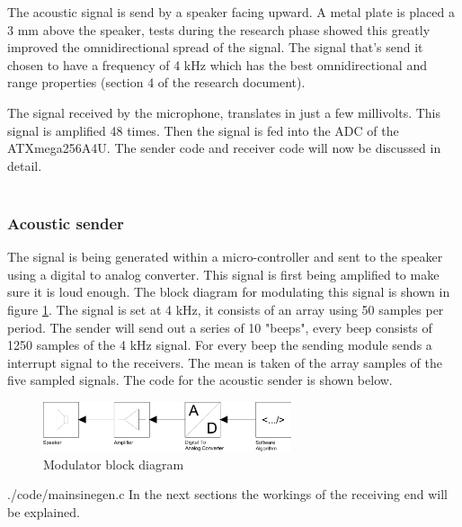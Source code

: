 \documentclass[10pt,a4paper]{article}
\begin{document}
The acoustic signal is send by a speaker facing upward. A metal plate is placed a 3 mm above the speaker, tests during the research phase showed this greatly improved the omnidirectional spread of the signal. The signal that's send it chosen to have a frequency of 4 kHz which has the best omnidirectional and range properties (section 4 of the research document).


The signal received by the microphone, translates in just a few millivolts. This signal is amplified 48 times. Then the signal is fed into the ADC of the ATXmega256A4U. The sender code and receiver code will now be discussed in detail.\\\\

\subsubsection{Acoustic sender}
The signal is being generated within a micro-controller and sent to the speaker using a digital to analog converter. This signal is first being amplified to make sure it is loud enough. The block diagram for modulating this signal is shown in figure \ref{fig:modulatorblock}. The signal is set at 4 kHz, it consists of an array using 50 samples per period. The sender will send out a series of 10 "beeps", every beep consists of 1250 samples of the 4 kHz signal. For every beep the sending  module sends a interrupt signal to the receivers. The mean is taken of the array samples of the five sampled signals. The code for the acoustic sender is shown below.

\begin{figure}[H]
    \centering
    \includegraphics[width=0.65\textwidth]{Modulator.pdf}
    \caption{Modulator block diagram}
    \label{fig:modulatorblock}
\end{figure}


{./code/mainsinegen.c}
In the next sections the workings of the receiving end will be explained.
\end{document}
